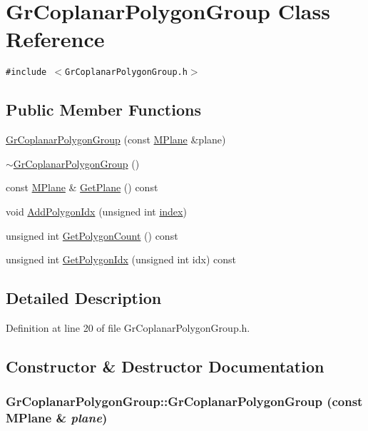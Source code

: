 \hypertarget{class_gr_coplanar_polygon_group}{
\section{GrCoplanarPolygonGroup Class Reference}
\label{class_gr_coplanar_polygon_group}
}
{\tt \#include $<$GrCoplanarPolygonGroup.h$>$}

\subsection*{Public Member Functions}
\begin{CompactItemize}
\item 
\hyperlink{class_gr_coplanar_polygon_group_30220f822d820321c2f7ae4b21bb2721}{GrCoplanarPolygonGroup} (const \hyperlink{class_m_plane}{MPlane} \&plane)
\item 
\hyperlink{class_gr_coplanar_polygon_group_8d147d335f0e5ffb552ffc38496fcc4c}{$\sim$GrCoplanarPolygonGroup} ()
\item 
const \hyperlink{class_m_plane}{MPlane} \& \hyperlink{class_gr_coplanar_polygon_group_e7ff3b0740353c8f2374155c9731676e}{GetPlane} () const 
\item 
void \hyperlink{class_gr_coplanar_polygon_group_59f43d1f94bc7755747fd6041f0de79e}{AddPolygonIdx} (unsigned int \hyperlink{glext__bak_8h_57f14e05b1900f16a2da82ade47d0c6d}{index})
\item 
unsigned int \hyperlink{class_gr_coplanar_polygon_group_8ef726fc062a4f38f21f7880f61c40ef}{GetPolygonCount} () const 
\item 
unsigned int \hyperlink{class_gr_coplanar_polygon_group_50a375daa58de0f2c8ac85be8b005bd0}{GetPolygonIdx} (unsigned int idx) const 
\end{CompactItemize}


\subsection{Detailed Description}


Definition at line 20 of file GrCoplanarPolygonGroup.h.

\subsection{Constructor \& Destructor Documentation}
\hypertarget{class_gr_coplanar_polygon_group_30220f822d820321c2f7ae4b21bb2721}{
\subsubsection[{GrCoplanarPolygonGroup}]{\setlength{\rightskip}{0pt plus 5cm}GrCoplanarPolygonGroup::GrCoplanarPolygonGroup (const {\bf MPlane} \& {\em plane})}}
\label{class_gr_coplanar_polygon_group_30220f822d820321c2f7ae4b21bb2721}




